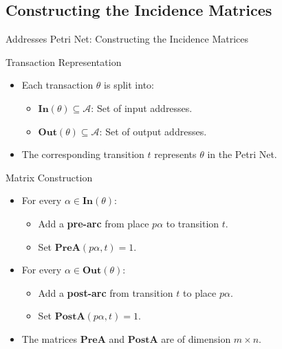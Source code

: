 \documentclass{beamer}
\begin{document}
\subsection{Constructing the Incidence Matrices}
\begin{frame}{Addresses Petri Net: Constructing the Incidence Matrices}
    \footnotesize
    \begin{block}{Transaction Representation}
        \begin{itemize}
            \item Each transaction \(\theta\) is split into:
                  \begin{itemize}
                      \item \(\textbf{In}(\theta) \subseteq \mathcal{A}\): Set of input addresses.
                      \item \(\textbf{Out}(\theta) \subseteq \mathcal{A}\): Set of output addresses.
                  \end{itemize}
            \item The corresponding transition \(t\) represents \(\theta\) in the Petri Net.
        \end{itemize}
    \end{block}

    \begin{block}{Matrix Construction}
        \begin{itemize}
            \item For every \(\alpha \in \textbf{In}(\theta)\):
                  \begin{itemize}
                      \item Add a \textbf{pre-arc} from place \(p\alpha\) to transition \(t\).
                      \item Set \(\mathbf{PreA}(p\alpha, t)=1\).
                  \end{itemize}
            \item For every \(\alpha \in \textbf{Out}(\theta)\):
                  \begin{itemize}
                      \item Add a \textbf{post-arc} from transition \(t\) to place \(p\alpha\).
                      \item Set \(\mathbf{PostA}(p\alpha, t)=1\).
                  \end{itemize}
            \item The matrices \(\mathbf{PreA}\) and \(\mathbf{PostA}\) are of dimension \(m\times n\).
        \end{itemize}
    \end{block}
\end{frame}
\end{document}
